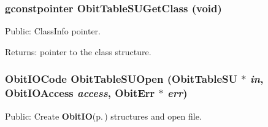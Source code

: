 \subsubsection{\setlength{\rightskip}{0pt plus 5cm}gconstpointer Obit\-Table\-SUGet\-Class (void)}\label{ObitTableSU_8h_a13}


Public: Class\-Info pointer. 

\begin{Desc}
\item[Returns:]pointer to the class structure. \end{Desc}
\subsubsection{\setlength{\rightskip}{0pt plus 5cm}Obit\-IOCode Obit\-Table\-SUOpen ({\bf Obit\-Table\-SU} $\ast$ {\em in}, Obit\-IOAccess {\em access}, {\bf Obit\-Err} $\ast$ {\em err})}\label{ObitTableSU_8h_a17}


Public: Create {\bf Obit\-IO}{\rm (p.\,\pageref{structObitIO})} structures and open file. 

